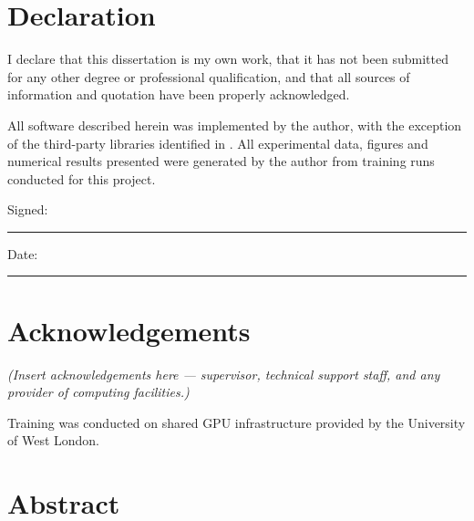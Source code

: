\documentclass[12pt,a4paper,oneside]{report}
\begin{document}
\setcounter{page}{2}

\chapter*{Declaration}

I declare that this dissertation is my own work, that it has not been submitted
for any other degree or professional qualification, and that all sources of
information and quotation have been properly acknowledged.

All software described herein was implemented by the author, with the exception
of the third-party libraries identified in . All experimental
data, figures and numerical results presented were generated by the author from
training runs conducted for this project.

\vspace{2.2cm}
\begin{flushleft}
Signed: \rule{7cm}{0.4pt}\qquad Date: \rule{3.5cm}{0.4pt}
\end{flushleft}

\chapter*{Acknowledgements}

{\itshape (Insert acknowledgements here --- supervisor, technical support staff,
and any provider of computing facilities.)}

\vspace{1em}

Training was conducted on shared GPU infrastructure provided by the University
of West London.

\cleardoublepage
\tableofcontents
\cleardoublepage
\listoffigures
\cleardoublepage
\listoftables

\cleardoublepage
{}
\setcounter{page}{1}

\hypertarget{abstract}{%
\chapter*{Abstract}
\label{abstract}}
\end{document}
